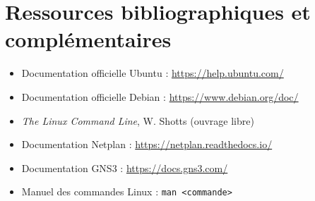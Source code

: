 \documentclass[11pt,a4paper]{article}
\begin{document}
\section{Ressources bibliographiques et compl\'ementaires}

\begin{itemize}[noitemsep]
    \item Documentation officielle Ubuntu : \url{https://help.ubuntu.com/}
    \item Documentation officielle Debian : \url{https://www.debian.org/doc/}
    \item \textit{The Linux Command Line}, W. Shotts (ouvrage libre)
    \item Documentation Netplan : \url{https://netplan.readthedocs.io/}
    \item Documentation GNS3 : \url{https://docs.gns3.com/}
    \item Manuel des commandes Linux : \texttt{man <commande>}
\end{itemize}
\end{document}
